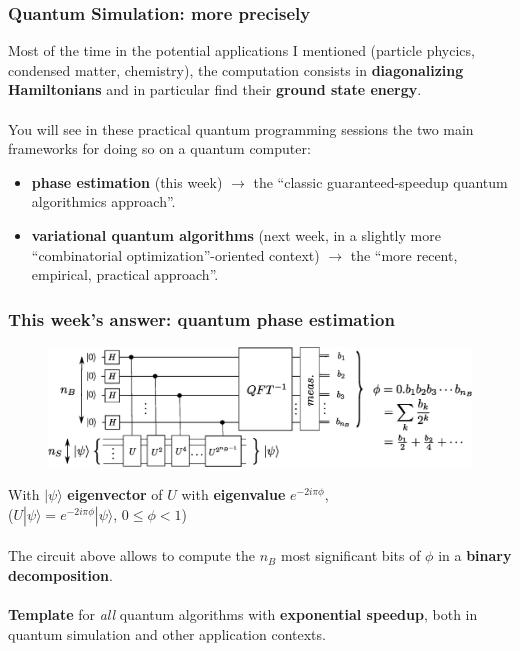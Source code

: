 \documentclass{beamer}
\begin{document}
\begin{frame}
\frametitle{Quantum Simulation: more precisely}

Most of the time in the potential applications I mentioned (particle phycics, condensed matter, chemistry),
the computation consists in \textbf{diagonalizing Hamiltonians} and in particular find their \textbf{ground
state energy}.\\~\\
You will see in these practical quantum programming sessions the two main frameworks for doing so on a quantum computer:
\begin{itemize}
\item \textbf{phase estimation} (this week) $\rightarrow$ the ``classic guaranteed-speedup quantum algorithmics approach''.
\item \textbf{variational quantum algorithms} \textcolor{blue}{\cite{cerezo2020variational}} (next week, in a slightly more ``combinatorial optimization''-oriented context) $\rightarrow$ the ``more recent, empirical, practical approach''. 
\end{itemize}

\end{frame}



\begin{frame}
\frametitle{This week's answer: quantum phase estimation}
\begin{center}
\begin{figure}
\includegraphics[width=\textwidth]{quantum_phase_estimation.eps}
\end{figure}
\end{center}

With $|\psi\rangle$ \textbf{eigenvector} of $U$ with \textbf{eigenvalue} $e^{-2i\pi\phi}$,\\
 ($U|\psi\rangle = e^{-2i\pi\phi}|\psi\rangle$, $0\leq\phi<1$)\\~\\
The circuit above allows to compute the $n_{B}$ most significant bits of $\phi$ in a \textbf{binary
decomposition}.\\~\\

\textbf{Template} for \emph{all} quantum algorithms with \textbf{exponential speedup}, both in quantum simulation
and other application contexts.\\
\end{frame}
\end{document}

